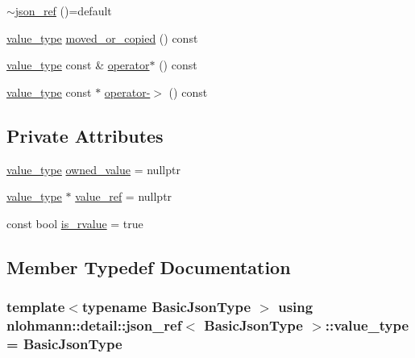 \begin{DoxyCompactItemize}
\item 
\hyperlink{classnlohmann_1_1detail_1_1json__ref_a8bcd4cfcafe952ce5140f8cb35ebe2f6}{$\sim$json\+\_\+ref} ()=default
\item 
\hyperlink{classnlohmann_1_1detail_1_1json__ref_a78d76cf288141049568c0d670ed670ef}{value\+\_\+type} \hyperlink{classnlohmann_1_1detail_1_1json__ref_ab82818e9b8cc63cb76e61fe6b68959a5}{moved\+\_\+or\+\_\+copied} () const 
\item 
\hyperlink{classnlohmann_1_1detail_1_1json__ref_a78d76cf288141049568c0d670ed670ef}{value\+\_\+type} const \& \hyperlink{classnlohmann_1_1detail_1_1json__ref_adec75260903212a3bf1235fced3f2e51}{operator$\ast$} () const 
\item 
\hyperlink{classnlohmann_1_1detail_1_1json__ref_a78d76cf288141049568c0d670ed670ef}{value\+\_\+type} const $\ast$ \hyperlink{classnlohmann_1_1detail_1_1json__ref_ae4492a0e856ba9bb8739e9bba988a8c6}{operator-\/$>$} () const 
\end{DoxyCompactItemize}
\subsection*{Private Attributes}
\begin{DoxyCompactItemize}
\item 
\hyperlink{classnlohmann_1_1detail_1_1json__ref_a78d76cf288141049568c0d670ed670ef}{value\+\_\+type} \hyperlink{classnlohmann_1_1detail_1_1json__ref_a5d7bd67a5ab713d9be1e248cf9d509cd}{owned\+\_\+value} = nullptr
\item 
\hyperlink{classnlohmann_1_1detail_1_1json__ref_a78d76cf288141049568c0d670ed670ef}{value\+\_\+type} $\ast$ \hyperlink{classnlohmann_1_1detail_1_1json__ref_a23504615c2076070d5e087443bb376a4}{value\+\_\+ref} = nullptr
\item 
const bool \hyperlink{classnlohmann_1_1detail_1_1json__ref_a434d1e18c21cc1b61954ba22b62ee7a5}{is\+\_\+rvalue} = true
\end{DoxyCompactItemize}


\subsection{Member Typedef Documentation}
\subsubsection[{\texorpdfstring{value\+\_\+type}{value_type}}]{\setlength{\rightskip}{0pt plus 5cm}template$<$typename Basic\+Json\+Type $>$ using {\bf nlohmann\+::detail\+::json\+\_\+ref}$<$ Basic\+Json\+Type $>$\+::{\bf value\+\_\+type} =  Basic\+Json\+Type}\hypertarget{classnlohmann_1_1detail_1_1json__ref_a78d76cf288141049568c0d670ed670ef}{}\label{classnlohmann_1_1detail_1_1json__ref_a78d76cf288141049568c0d670ed670ef}


